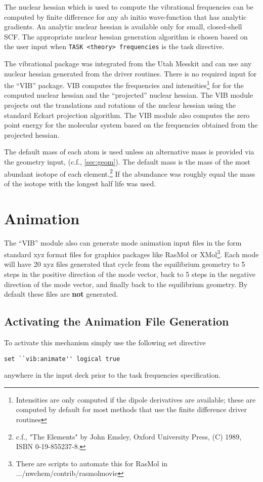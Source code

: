 \label{sec:vib}

The nuclear hessian which is used to compute the vibrational
frequencies can be computed by finite difference for any ab initio
wave-function that has analytic gradients.  An analytic nuclear hessian
is available only for small, closed-shell SCF.  The appropriate
nuclear hessian generation algorithm is chosen based on the user input
when \verb+TASK <theory> frequencies+ is the task directive.

The vibrational package was integrated from the Utah Messkit and can
use any nuclear hessian generated from the driver routines.  There is
no required input for the ``VIB'' package.  VIB computes the
frequencies and intensities\footnote{Intensities are only computed if
  the dipole derivatives are available; these are computed by default
  for most methods that use the finite difference driver routines} for
for the computed nuclear hessian and the ``projected'' nuclear
hessian.  The VIB module projects out the translations and rotations
of the nuclear hessian using the standard Eckart projection algorithm.
The VIB module also computes the zero point energy for the molecular
system based on the frequencies obtained from the projected hessian.

The default mass of each atom is used unless an alternative mass is
provided via the geometry input, (c.f., \ref{sec:geom}).  The default
mass is the mass of the most abundant isotope of each
element.\footnote{c.f., "The Elements" by John Emsley, Oxford
  University Press, (C) 1989, ISBN 0-19-855237-8.} If the abundance
was roughly equal the mass of the isotope with the longest half life
was used.

\section{Animation} 
The ``VIB'' module also can generate mode animation input files in the
form standard xyz format files for graphics packages like
RasMol or XMol\footnote{There are scripts to automate this for RasMol in
.../nwchem/contrib/rasmolmovie}.  Each mode will have 20 xyz
files generated that cycle from the equilibrium geometry to 5 steps in
the positive direction of the mode vector, back to 5 steps in the
negative direction of the mode vector, and finally back to the
equilibrium geometry.  By default these files are {\bf not} generated.
\subsection{Activating the Animation File Generation}
To activate this mechanism simply use the following set directive 
\begin{verbatim}
set ``vib:animate'' logical true
\end{verbatim}
anywhere in the input deck prior to the task frequencies specification.  
